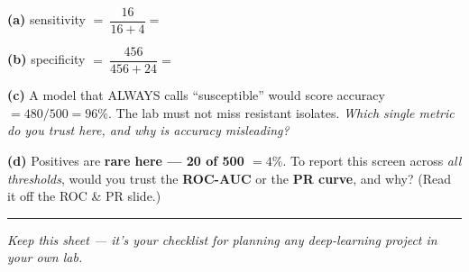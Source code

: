\documentclass[11pt]{article}
\newif\ifsolution
\newcommand{\blk}[1]{\underline{\hspace{#1}}}
\newcommand{\rb}[2]{\ifsolution\textbf{#1}\else\blk{#2}\fi}
\newcommand{\keybox}[1]{\ifsolution\par\vspace{2pt}%
  \fbox{\parbox{0.965\textwidth}{\small\textbf{Suggested answer.}\; #1}}\par\fi}
\newcommand{\work}[1]{\ifsolution\else\vspace{#1}\fi}
\begin{document}
\vspace{3pt}
\textbf{(a)} sensitivity $=\ \dfrac{16}{16+4} =\ $ \rb{$16/20 = 0.80$ \,(80\%)}{3.4cm}
\work{0.35cm}

\textbf{(b)} specificity $=\ \dfrac{456}{456+24} =\ $ \rb{$456/480 = 0.95$ \,(95\%)}{3.4cm}
\work{0.35cm}

\textbf{(c)} A model that ALWAYS calls ``susceptible'' would score accuracy $= 480/500 = 96\%$. The lab must not miss resistant
isolates. \emph{Which single metric do you trust here, and why is accuracy misleading?}

\work{1.1cm}
\ifsolution\else\blk{\linewidth}\par\vspace{2pt}\blk{\linewidth}\fi

\textbf{(d)} Positives are \textbf{rare here --- 20 of 500 $= 4\%$}. To report this screen across \emph{all thresholds}, would you trust the
\textbf{ROC-AUC} or the \textbf{PR curve}, and why? {\small (Read it off the ROC \& PR slide.)}

\work{1.0cm}
\ifsolution\else\blk{\linewidth}\par\vspace{2pt}\blk{\linewidth}\fi

\keybox{(a) sensitivity $= 16/(16+4) = 16/20 = \mathbf{0.80}$ (\textbf{80\%}). (b) specificity $= 456/(456+24) = 456/480 = \mathbf{0.95}$
(\textbf{95\%}). (c) Trust \textbf{sensitivity} (recall) --- reported with the \textbf{PR curve} --- not accuracy. Positives are rare (20 of 500),
so accuracy is dominated by the 480 susceptibles: an always-``susceptible'' model scores \textbf{96\%} yet catches \textbf{0 of 20} resistant
isolates. Sensitivity is the metric that exposes the missed cases. (d) Trust the \textbf{PR curve}. At \textbf{4\%} prevalence the true-negatives
dominate, so \textbf{ROC-AUC can look flatteringly high}; the PR curve's chance baseline sits at the prevalence itself (\textbf{0.04}), so it stays
honest and unforgiving as recall grows --- report sensitivity/recall alongside the PR curve, never accuracy or ROC-AUC alone.}

\vspace{4pt}\hrule\vspace{3pt}
{\small\itshape \ifsolution Suggested-answer key --- other defensible representations/risks may earn credit if consistent with the chart.%
\else Keep this sheet --- it's your checklist for planning any deep-learning project in your own lab.\fi}
\end{document}
